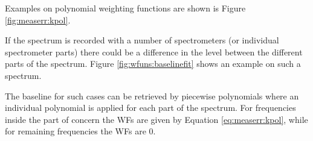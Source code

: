  Examples on polynomial weighting functions are shown is Figure 
 \ref{fig:measerr:kpol}.



 \label{sec:measerr:ppol}
 
 If the spectrum is recorded with a number of spectrometers (or
 individual spectrometer parts) there could be a difference in the
 level between the different parts of the spectrum. Figure
 \ref{fig:wfuns:baselinefit} shows an example on such a spectrum.
 
 The baseline for such cases can be retrieved by piecewise polynomials
 where an individual polynomial is applied for each part of the
 spectrum. For frequencies inside the part of concern the WFs are
 given by Equation \ref{eq:measerr:kpol}, while for remaining
 frequencies the WFs are 0.  


